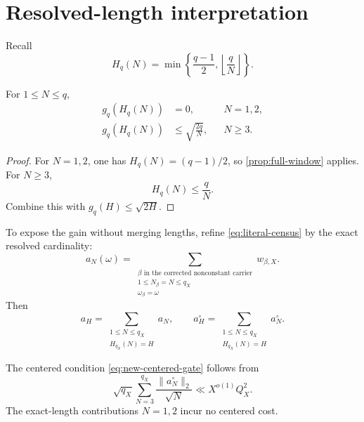 \section{Resolved-length interpretation}
\label{sec:length-weighted}

Recall
\[
 H_q(N)
 =
 \min\left\{\frac{q-1}{2},\left\lfloor\frac qN\right\rfloor\right\}.
\]

\begin{proposition}
\label{prop:length-gain}
For \(1\le N\le q\),
\begin{align}
 g_q(H_q(N))&=0,
 &&N=1,2,
\label{eq:length-endpoint}\\
 g_q(H_q(N))&\le\sqrt{\frac{2q}{N}},
 &&N\ge3.
\label{eq:length-gain}
\end{align}
\end{proposition}

\begin{proof}
For \(N=1,2\), one has
\(H_q(N)=(q-1)/2\), so
\cref{prop:full-window} applies.  For \(N\ge3\),
\[
 H_q(N)\le\frac qN.
\]
Combine this with \(g_q(H)\le\sqrt{2H}\).
\end{proof}

To expose the gain without merging lengths, refine
\eqref{eq:literal-census} by the exact resolved cardinality:
\begin{equation}
 a_N(\omega)
 =
 \sum_{\substack{\beta\text{ in the corrected nonconstant carrier}\\
                  1\le N_\beta=N\le q_X\\
                  \omega_\beta=\omega}}
 w_{\beta,X}.
\label{eq:exact-length-census}
\end{equation}
Then
\[
 a_H
 =
 \sum_{\substack{1\le N\le q_X\\
                  H_{q_X}(N)=H}}
 a_N,
\qquad
 a_H^\circ
 =
 \sum_{\substack{1\le N\le q_X\\
                  H_{q_X}(N)=H}}
 a_N^\circ.
\]

\begin{corollary}
\label{cor:length-gate}
The centered condition \eqref{eq:new-centered-gate} follows from
\begin{equation}
 \sqrt{q_X}
 \sum_{N=3}^{q_X}
 \frac{\|a_N^\circ\|_2}{\sqrt N}
 \ll X^{o(1)}Q_X^2.
\label{eq:length-weighted-gate}
\end{equation}
The exact-length contributions \(N=1,2\) incur no centered cost.
\end{corollary}

